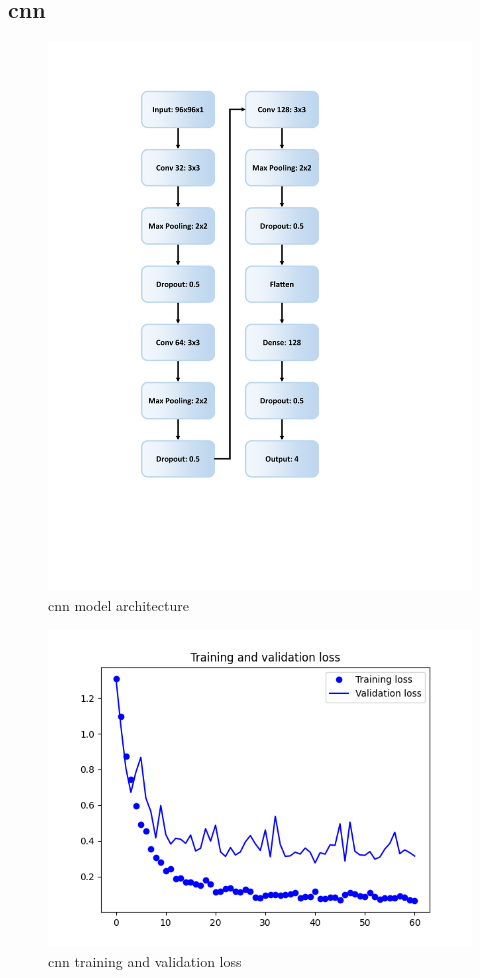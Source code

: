 \documentclass[10pt,twocolumn,letterpaper]{article}
\begin{document}
\subsection{\acrlong{cnn}}

\begin{figure}[H]
  \centering
   \includegraphics[width=0.9\linewidth, trim={13em, 16em, 22em, 7em}, clip]{cnn}
   \caption{\acrshort{cnn} model architecture}
   \label{fig:cnn}
\end{figure}

\begin{figure}[H]
  \centering
   \includegraphics[width=0.9\linewidth, trim={3em, 2em, 4em, 4em}, clip]{cnn_loss}
   \caption{\acrshort{cnn} training and validation loss}
   \label{fig:cnn_loss}
\end{figure}
\end{document}
